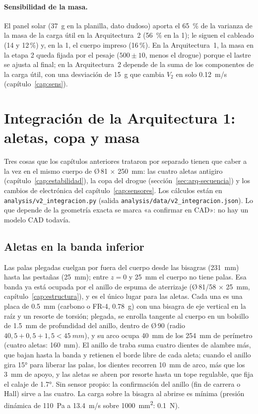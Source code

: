 \paragraph{Sensibilidad de la masa.} El panel solar (\SI{37}{g} en la planilla, dato dudoso)
aporta el \SI{65}{\percent} de la varianza de la masa de la carga útil en la
Arquitectura~2 (\SI{56}{\percent} en la 1); le siguen el cableado (14 y 12\,\%) y, en la 1,
el cuerpo impreso (16\,\%). En la Arquitectura~1, la masa en la etapa 2 queda fijada
por el pesaje ($500\pm10$, menos el drogue) porque el lastre se ajusta al final; en la
Arquitectura~2 depende de la suma de los componentes de la carga útil, con una desviación de
\SI{15}{g} que cambia $V_2$ en solo \SI{0.12}{m/s} (capítulo~\ref{cap:sens}).

\section{Integración de la Arquitectura 1: aletas, copa y masa}\label{sec:arq-integracion}

Tres cosas que los capítulos anteriores trataron por separado tienen que caber a la vez en el
mismo cuerpo de Ø\,81 $\times$ \SI{250}{mm}: las cuatro aletas antigiro (capítulo~\ref{cap:estabilidad}),
la copa del drogue (sección~\ref{sec:arq-secuencia}) y los cambios de electrónica del
capítulo~\ref{cap:sensores}. Los cálculos están en \texttt{analysis/v2\_integracion.py}
(salida \texttt{analysis/data/v2\_integracion.json}). Lo que depende de la geometría exacta
se marca «a confirmar en CAD»: no hay un modelo CAD todavía.

\subsection{Aletas en la banda inferior}
Las palas plegadas cuelgan por fuera del cuerpo desde las bisagras (\SI{231}{mm}) hasta las
pestañas (\SI{25}{mm}); entre $z=0$ y \SI{25}{mm} el cuerpo no tiene palas. Esa banda ya está
ocupada por el anillo de espuma de aterrizaje (Ø\,81/58 $\times$ \SI{25}{mm}, capítulo~\ref{cap:estructura}),
y es el único lugar para las aletas. Cada una es una placa de \SI{0.5}{mm} (carbono o FR-4, \SI{0.78}{g})
con una bisagra de eje vertical en la raíz y un resorte de torsión; plegada, se enrolla tangente al cuerpo en un
bolsillo de \SI{1.5}{mm} de profundidad del anillo, dentro de Ø\,90 (radio $40{,}5+0{,}5+1{,}5<\SI{45}{mm}$), y su arco
ocupa \SI{40}{mm} de los \SI{254}{mm} de perímetro (cuatro aletas: \SI{160}{mm}). El anillo de traba
suma cuatro dientes de alambre más, que bajan hasta la banda y retienen el borde libre de cada
aleta; cuando el anillo gira \ang{15} para liberar las palas, los dientes recorren \SI{10}{mm}
de arco, más que los \SI{3}{mm} de apoyo, y las aletas se abren por resorte hasta un tope
regulable, que fija el calaje de \ang{1.7}. Sin sensor propio: la confirmación del anillo (fin de carrera o Hall) sirve
a las cuatro. La carga sobre la bisagra al abrirse es mínima (presión dinámica de \SI{110}{Pa} a
\SI{13.4}{m/s} sobre \SI{1000}{mm^2}: \SI{0.1}{N}).

